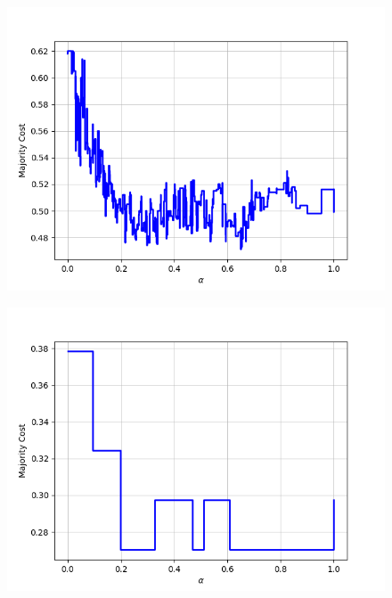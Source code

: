 \begin{figure}[h]
\begin{minipage}{.24\textwidth}
  {\includegraphics[width=\linewidth]{plots/nell-ac/person}}
\end{minipage}
\begin{minipage}{.24\textwidth}
  \centering
  {\includegraphics[width=\linewidth]{plots/nell-ac/personbylocation}}
\end{minipage}
\begin{minipage}{.24\textwidth}
  \centering

\end{minipage}
\end{figure}
